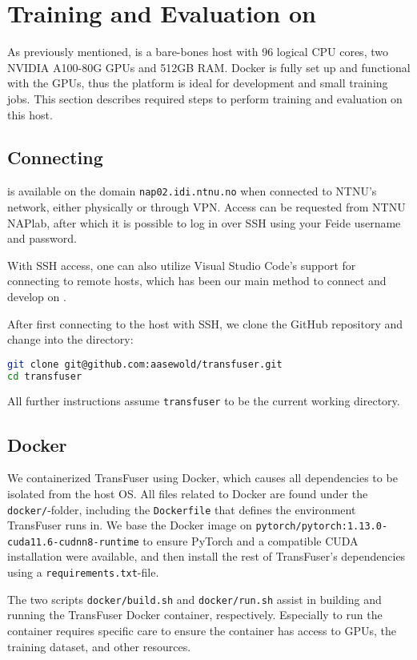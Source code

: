 \section{Training and Evaluation on \nap}
\label{app:sec:nap02}

As previously mentioned,
\nap is a bare-bones host with
96 logical CPU cores,
two NVIDIA A100-80G GPUs
and 512GB RAM.
Docker is fully set up and functional with the GPUs,
thus the platform is ideal for development and small training jobs.
This section describes required steps to perform training and evaluation on this host.

\subsection{Connecting}

\nap is available on the domain \texttt{nap02.idi.ntnu.no}
when connected to NTNU's network, either physically or through VPN.
Access can be requested from NTNU NAPlab,
after which it is possible to log in over SSH using your Feide username and password.

With SSH access,
one can also utilize Visual Studio Code's support for connecting to remote hosts,
which has been our main method to connect and develop on \nap.

After first connecting to the host with SSH,
we clone the GitHub repository 
and change into the directory:
\begin{lstlisting}[language=bash]
git clone git@github.com:aasewold/transfuser.git
cd transfuser
\end{lstlisting}
All further instructions assume \texttt{transfuser} to be the current working directory.

\subsection{Docker}

We containerized TransFuser using Docker,
which causes all dependencies to be isolated from the host OS.
All files related to Docker are found under the \texttt{docker/}-folder,
including the \texttt{Dockerfile} that defines the environment TransFuser runs in.
We base the Docker image on \texttt{pytorch/pytorch:1.13.0-cuda11.6-cudnn8-runtime}
to ensure PyTorch and a compatible CUDA installation were available,
and then install the rest of TransFuser's dependencies using a \texttt{requirements.txt}-file.

The two scripts \texttt{docker/build.sh} and \texttt{docker/run.sh}
assist in building and running the TransFuser Docker container, respectively.
Especially to run the container requires specific care
to ensure the container has access to GPUs, the training dataset, and other resources.

